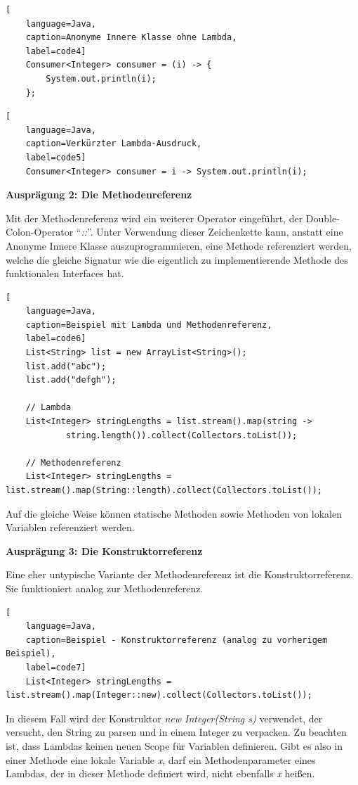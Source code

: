 \begin{lstlisting}[
    language=Java,
    caption=Anonyme Innere Klasse ohne Lambda,
    label=code4]
	Consumer<Integer> consumer = (i) -> {
		System.out.println(i);
	};
\end{lstlisting}  

\begin{lstlisting}[
    language=Java,
    caption=Verkürzter Lambda-Ausdruck,
    label=code5]
	Consumer<Integer> consumer = i -> System.out.println(i);	
\end{lstlisting}  

\textbf{Ausprägung 2: Die Methodenreferenz}

Mit der Methodenreferenz wird ein weiterer Operator eingeführt, der Double-Colon-Operator \enquote{\textit{::}}. Unter Verwendung dieser Zeichenkette kann, anstatt eine Anonyme Innere Klasse auszuprogrammieren, eine Methode referenziert werden, welche die gleiche Signatur wie die eigentlich zu implementierende Methode des funktionalen Interfaces hat. \cite[S. 81f.]{Ullenboom2014}

\begin{lstlisting}[
    language=Java,
    caption=Beispiel mit Lambda und Methodenreferenz,
    label=code6]
	List<String> list = new ArrayList<String>();
	list.add("abc");
	list.add("defgh");	
	
	// Lambda
	List<Integer> stringLengths = list.stream().map(string ->
			string.length()).collect(Collectors.toList());	
	
	// Methodenreferenz
	List<Integer> stringLengths = list.stream().map(String::length).collect(Collectors.toList());
\end{lstlisting}  


Auf die gleiche Weise können statische Methoden sowie Methoden von lokalen Variablen referenziert werden.

\textbf{Ausprägung 3: Die Konstruktorreferenz}

Eine eher untypische Variante der Methodenreferenz ist die Konstruktorreferenz. Sie funktioniert analog zur Methodenreferenz. \cite[S. 83f.]{Ullenboom2014}

\begin{lstlisting}[
    language=Java,
    caption=Beispiel - Konstruktorreferenz (analog zu vorherigem Beispiel),
    label=code7]
	List<Integer> stringLengths = list.stream().map(Integer::new).collect(Collectors.toList());
\end{lstlisting} 

In diesem Fall wird der Konstruktor \textit{new Integer(String s)} verwendet, der versucht, den String zu parsen und in einem Integer zu verpacken.
Zu beachten ist, dass Lambdas keinen neuen Scope für Variablen definieren. Gibt es also in einer Methode eine lokale Variable \textit{x}, darf ein Methodenparameter eines Lambdas, der in dieser Methode definiert wird, nicht ebenfalls \textit{x} heißen. \cite{OracleLambda}

